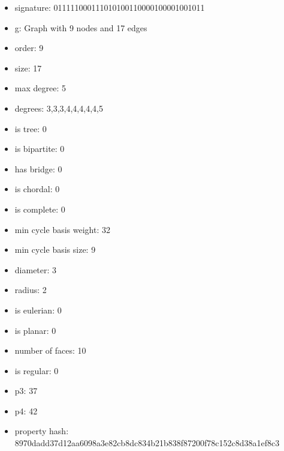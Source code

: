 \newpage
\begin{figure}
\end{figure}
\begin{itemize}
\item signature: 011111000111010100110000100001001011
\item g: Graph with 9 nodes and 17 edges
\item order: 9
\item size: 17
\item max degree: 5
\item degrees: 3,3,3,4,4,4,4,4,5
\item is tree: 0
\item is bipartite: 0
\item has bridge: 0
\item is chordal: 0
\item is complete: 0
\item min cycle basis weight: 32
\item min cycle basis size: 9
\item diameter: 3
\item radius: 2
\item is eulerian: 0
\item is planar: 0
\item number of faces: 10
\item is regular: 0
\item p3: 37
\item p4: 42
\item property hash: 8970dadd37d12aa6098a3e82cb8dc834b21b838f87200f78c152c8d38a1ef8c3
\end{itemize}
